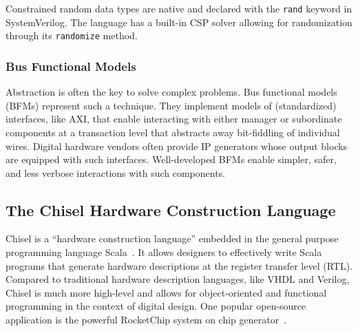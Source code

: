 \documentclass[conference]{IEEEtran}
\begin{document}

Constrained random data types are native and declared with the \texttt{rand} keyword in SystemVerilog. 
The language has a built-in CSP solver allowing for randomization through its \texttt{randomize} method.

\subsubsection{Bus Functional Models}

Abstraction is often the key to solve complex problems. Bus functional models (BFMs) represent such 
a technique. They implement models of (standardized) interfaces, like AXI, that enable 
interacting with either manager or subordinate components at a transaction level that abstracts away 
bit-fiddling of individual wires. Digital hardware vendors often provide IP generators whose output 
blocks are equipped with such interfaces. Well-developed BFMs enable simpler, safer, and less 
verbose interactions with such components.

\subsection{The Chisel Hardware Construction Language}\label{subsec:chisel}


Chisel is a ``hardware construction language'' embedded in the general purpose programming language Scala~\cite{bachrach2012chisel, chisel:book}.
It allows designers to effectively write Scala programs that generate hardware descriptions at the register transfer level (RTL).
Compared to traditional hardware description languages, like 
VHDL and Verilog, Chisel is much more high-level and allows for object-oriented and functional 
programming in the context of digital design.
One popular open-source application is the powerful RocketChip system on chip generator~\cite{rocketchip}.
\end{document}
